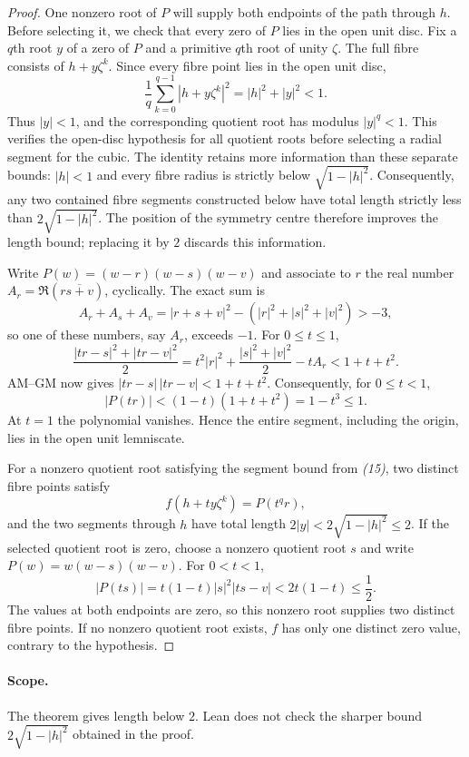 \documentclass[11pt]{article}
\begin{document}
\begin{proof}
One nonzero root of $P$ will supply both endpoints of the path through
$h$. Before selecting it, we check that every zero of $P$ lies in the
open unit disc. Fix a $q$th root $y$ of a zero of $P$ and a primitive
$q$th root of unity $\zeta$. The full fibre consists of $h+y\zeta^k$.  Since every fibre point
lies in the open unit disc,
\[
 \frac1q\sum_{k=0}^{q-1}|h+y\zeta^k|^2
   =|h|^2+|y|^2<1.                                \tag{14}
\]
Thus $|y|<1$, and the corresponding quotient root has modulus
$|y|^q<1$.  This verifies the open-disc hypothesis for all quotient roots
before selecting a radial segment for the cubic.
The identity retains more information than these separate bounds:
$|h|<1$ and every fibre radius is strictly below $\sqrt{1-|h|^2}$.
Consequently, any two contained fibre segments constructed below have total length
strictly less than $2\sqrt{1-|h|^2}$.  The position of the symmetry centre
therefore improves the length bound; replacing it by $2$ discards this information.

Write $P(w)=(w-r)(w-s)(w-v)$ and associate to $r$ the real number
$A_r=\Re(r\overline{s+v})$, cyclically.  The exact sum is
\[
 A_r+A_s+A_v=|r+s+v|^2-(|r|^2+|s|^2+|v|^2)>-3,
\]
so one of these numbers, say $A_r$, exceeds $-1$. For $0\le t\le1$,
\[
 \frac{|tr-s|^2+|tr-v|^2}{2}
 =t^2|r|^2+\frac{|s|^2+|v|^2}{2}-tA_r<1+t+t^2.
\]
AM--GM now gives $|tr-s|\,|tr-v|<1+t+t^2$.
Consequently, for $0\le t<1$,
\[
 |P(tr)|<(1-t)(1+t+t^2)=1-t^3\le1.              \tag{15}
\]
At $t=1$ the polynomial vanishes. Hence the entire segment, including
the origin, lies in the open unit lemniscate.

For a nonzero quotient root satisfying the segment bound from \emph{(15)}, two distinct
fibre points satisfy
\[
 f(h+ty\zeta^k)=P(t^qr),
\]
and the two segments through $h$ have total length
$2|y|<2\sqrt{1-|h|^2}\le2$.  If the selected
quotient root is zero, choose a nonzero quotient root $s$ and write
$P(w)=w(w-s)(w-v)$. For $0<t<1$,
\[
 |P(ts)|=t(1-t)|s|^2|ts-v|<2t(1-t)\le\frac12.
\]
The values at both endpoints are zero, so this nonzero root supplies
two distinct fibre points. If no nonzero quotient root exists, $f$ has
only one distinct zero value, contrary to the hypothesis.
\end{proof}

\paragraph{Scope.}
\label{rem:cubic-quotient-formal-boundary}
\label{bdry:solved-polynomial-families}
The theorem gives length below $2$. Lean does not check the sharper bound
$2\sqrt{1-|h|^2}$ obtained in the proof.
\end{document}

